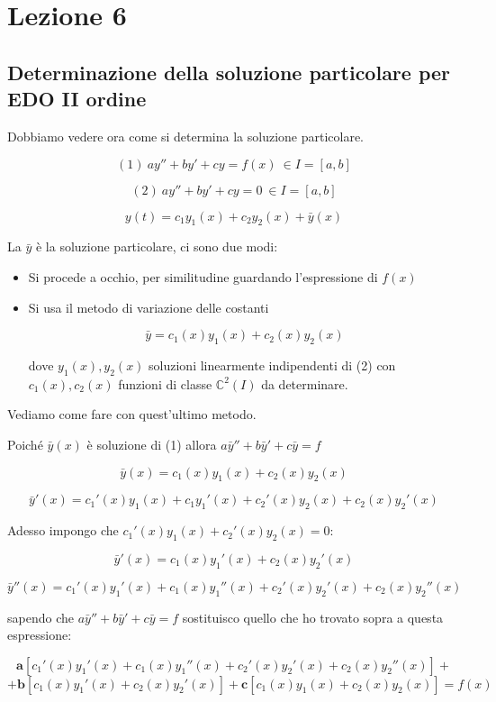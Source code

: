 \documentclass[../appunti-analisi.tex]{subfiles}
\begin{document}
\section{Lezione 6}

\subsection{Determinazione della soluzione particolare per EDO II ordine}


Dobbiamo vedere ora come si determina la soluzione particolare.

\[
    (1)\ ay''+by'+cy = f(x)\ \in I=[a,b]
\]

\[
    (2)\ ay''+by'+cy = 0\ \in I=[a,b]
\]

\[
    y(t) = c_1 y_1(x) + c_2 y_2(x) + \bar{y} (x)
\]

La $\bar{y}$ è la soluzione particolare, ci sono due modi:

\begin{itemize}
    \item Si procede a occhio, per similitudine guardando l'espressione di $f(x)$
    \item Si usa il metodo di variazione delle costanti

        \[
            \bar{y} = c_1(x) y_1(x) + c_2(x) y_2(x)
        \]

        dove ${y_1(x),y_2(x)}$ soluzioni linearmente indipendenti di (2) con $c_1(x),c_2(x)$ funzioni di classe $\mathbb{C}^{2}(I)$ da determinare.
\end{itemize}

Vediamo come fare con quest'ultimo metodo.

Poiché $\bar{y} (x)$ è soluzione di (1) allora  $a\bar{y} ''+b \bar{y}'+c\bar{y}=f$

\[
    \bar{y} (x) = c_1(x) y_1(x) + c_2(x) y_2(x)
\]

\[
\bar{y} '(x) = c_1'(x) y_1(x) + c_1 y_1'(x) + c_2'(x) y_2(x) + c_2(x) y_2'(x)
\]

Adesso impongo che $c_1'(x) y_1(x) + c_2'(x) y_2(x) = 0$:

\[
    \bar{y} '(x) = c_1(x) y_1'(x) +c_2(x) y_2'(x)
\]

\[
    \bar{y} ''(x) = c_1'(x) y_1'(x) + c_1(x) y_1''(x) + c_2'(x) y_2'(x) + c_2(x) y_2''(x)
\]

sapendo che $a \bar{y} ''+ b \bar{y} ' + c \bar{y}  = f$ sostituisco quello che ho trovato sopra a questa espressione:

\[
    \textbf{a}[c_1'(x) y_1'(x) + c_1(x) y_1''(x) + c_2'(x) y_2'(x) +c_2(x) y_2''(x)]+
\]
\[
     + \textbf{b}[c_1(x) y_1'(x) + c_2(x) y_2'(x)]+ \textbf{c}[c_1(x) y_1(x) + c_2(x) y_2(x)] = f(x)
\]
\end{document}
